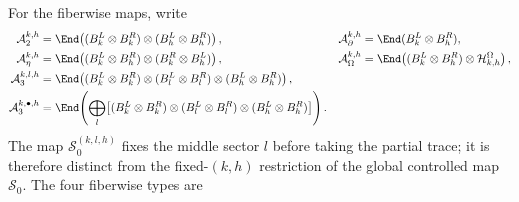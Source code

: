 For the fiberwise maps, write
\begin{align}
    \mathcal A_2^{k,h}
     & =\End\!\left((B_k^L\otimes B_k^R)\otimes(B_h^L\otimes B_h^R)\right),
     &
    \mathcal A_{\partial}^{k,h}
     & =\End(B_k^L\otimes B_h^R), \notag                                                \\
    \mathcal A_{\eta}^{k,h}
     & =\End\!\left((B_k^L\otimes B_h^R)\otimes(B_k^R\otimes B_h^L)\right),
     &
    \mathcal A_{\Omega}^{k,h}
     & =\End\!\left((B_k^L\otimes B_h^R)\otimes\mathcal H^{\Omega}_{k,h}\right), \notag \\
    \mathcal A_3^{k,l,h}
     & =\End\!\left((B_k^L\otimes B_k^R)\otimes(B_l^L\otimes B_l^R)
    \otimes(B_h^L\otimes B_h^R)\right), \notag                                          \\
    \mathcal A_3^{k,\bullet,h}
     & =\End\!\left(\bigoplus_l
    \bigl[(B_k^L\otimes B_k^R)\otimes(B_l^L\otimes B_l^R)
            \otimes(B_h^L\otimes B_h^R)\bigr]\right). \notag
\end{align}
The map $\mathcal S_0^{(k,l,h)}$ fixes the middle sector $l$ before taking the
partial trace; it is therefore distinct from the fixed-$(k,h)$ restriction of
the global controlled map $\mathcal S_0$. The four fiberwise types are
\par\noindent\hfil
{}
\hfil\par
